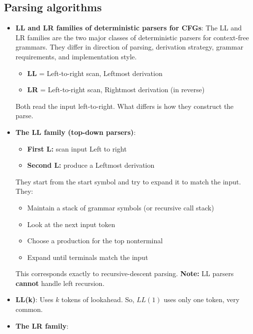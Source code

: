 \documentclass{report}
\begin{document}
    \pagebreak 
    \subsection{Parsing algorithms}
    \begin{itemize}
        \item \textbf{LL and LR families of deterministic parsers for CFGs}: The LL and LR families are the two major classes of deterministic parsers for context-free grammars. They differ in direction of parsing, derivation strategy, grammar requirements, and implementation style.
            \begin{itemize}
                \item \textbf{LL} = Left-to-right scan, Leftmost derivation
                \item \textbf{LR} = Left-to-right scan, Rightmost derivation (in reverse)
            \end{itemize}
            Both read the input left-to-right. What differs is how they construct the parse.
        \item \textbf{The LL family (top-down parsers)}: 
            \begin{itemize}
                \item \textbf{First L:} scan input Left to right
                \item \textbf{Second L:} produce a Leftmost derivation
            \end{itemize}
            They start from the start symbol and try to expand it to match the input.  They:
            \begin{itemize}
                \item Maintain a stack of grammar symbols (or recursive call stack)
                \item Look at the next input token
                \item Choose a production for the top nonterminal
                \item Expand until terminals match the input
            \end{itemize}
            This corresponds exactly to recursive-descent parsing.           
            \bigbreak \noindent 
            \textbf{Note:} LL parsers \textbf{cannot} handle left recursion.
        \item \textbf{LL(k)}: Uses $k$ tokens of lookahead. So, $LL(1)$ uses only one token, very common.
        \item \textbf{The LR family}: 
            \begin{itemize}

\end{itemize}
\end{itemize}
\end{document}

